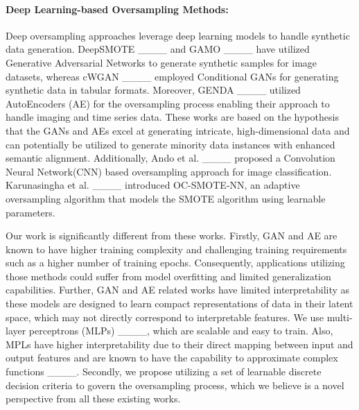 \paragraph{\textbf{Deep Learning-based Oversampling Methods: }} Deep oversampling approaches leverage deep learning models to handle synthetic data generation. DeepSMOTE ____ and GAMO ____ have utilized Generative Adversarial Networks to generate synthetic samples for image datasets, whereas cWGAN ____ employed Conditional GANs for generating synthetic data in tabular formats. Moreover, GENDA ____ utilized AutoEncoders (AE) for the oversampling process enabling their approach to handle imaging and time series data. These works are based on the hypothesis that the GANs and AEs excel at generating intricate, high-dimensional data and can potentially be utilized to generate minority data instances with enhanced semantic alignment. Additionally,  Ando et al. ____ proposed a Convolution Neural Network(CNN) based oversampling approach for image classification. Karunasingha et al. ____ introduced OC-SMOTE-NN, an adaptive oversampling algorithm that models the SMOTE  algorithm using learnable parameters.

Our work is significantly different from these works. Firstly, GAN and AE are known to have higher training complexity and challenging training requirements such as a higher number of training epochs.  Consequently, applications utilizing those methods could suffer from model overfitting and limited generalization capabilities. Further, GAN and AE related works have limited interpretability as these models are designed to learn compact representations of data in their latent space, which may not directly correspond to interpretable features.  We use multi-layer perceptrons (MLPs) ____, which are scalable and easy to train. Also, MPLs have higher interpretability due to their direct mapping between input and output features and are known to have the capability to approximate complex functions ____. Secondly, we propose utilizing a set of learnable discrete decision criteria to govern the oversampling process, which we believe is a novel perspective from all these existing works.